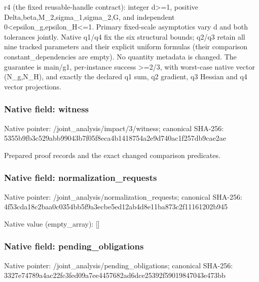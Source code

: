 \documentclass[10pt,a4paper]{article}
\begin{document}
\begingroup\raggedright\sloppy r4 (the fixed reusable-handle contract):\allowbreak{} integer d>=\allowbreak{}1,\allowbreak{} positive Delta,\allowbreak{}beta,\allowbreak{}M\_\allowbreak{}2,\allowbreak{}sigma\_\allowbreak{}1,\allowbreak{}sigma\_\allowbreak{}2,\allowbreak{}G,\allowbreak{} and independent 0<epsilon\_\allowbreak{}g,\allowbreak{}epsilon\_\allowbreak{}H<=\allowbreak{}1. Primary fixed-scale asymptotics vary d and both tolerances jointly. Native q1/\allowbreak{}q4 fix the six structural bounds;\allowbreak{} q2/\allowbreak{}q3 retain all nine tracked parameters and their explicit uniform formulas (their comparison constant\_\allowbreak{}dependencies are empty). No quantity metadata is changed. The guarantee is main/\allowbreak{}g1,\allowbreak{} per-instance success >=\allowbreak{}2/\allowbreak{}3,\allowbreak{} with worst-case native vector (N\_\allowbreak{}g,\allowbreak{}N\_\allowbreak{}H),\allowbreak{} and exactly the declared q1 sum,\allowbreak{} q2 gradient,\allowbreak{} q3 Hessian and q4 vector projections.\par\endgroup

\subsubsection{Native field: witness}
Native pointer: /joint\_\allowbreak{}analysis/impact/3/witness; canonical SHA-256: 5355b9fb3c529abb99043b7f05f8eca4b1418754a2e9d740ac1f257db9cae2ae

\begingroup\raggedright\sloppy Prepared proof records and the exact changed comparison predicates.\par\endgroup

\subsubsection{Native field: normalization\_\allowbreak{}requests}
Native pointer: /joint\_\allowbreak{}analysis/normalization\_\allowbreak{}requests; canonical SHA-256: 4f53cda18c2baa0c0354bb5f9a3ecbe5ed12ab4d8e11ba873c2f11161202b945

Native value (empty\_\allowbreak{}array): []

\subsubsection{Native field: pending\_\allowbreak{}obligations}
Native pointer: /joint\_\allowbreak{}analysis/pending\_\allowbreak{}obligations; canonical SHA-256: 3327e74789a4ac22fc3fed09a7ee4457682ad6dce25392f59019847043e473bb
\end{document}
